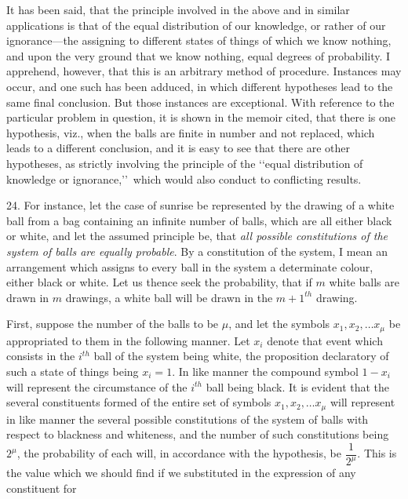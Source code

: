 \documentclass[oneside]{book}
\begin{document}
It has been said, that the principle involved in the above
and in similar applications is that of the equal distribution of
our knowledge, or rather of our ignorance---the assigning to
different states of things of which we know nothing, and upon
the very ground that we know nothing, equal degrees of probability. I apprehend, however, that this is an arbitrary method of
procedure. Instances may occur, and one such has been adduced,
in which different hypotheses lead to the same final conclusion.
But those instances are exceptional. With reference to the particular problem in question, it is shown in the memoir cited, that
there is one hypothesis, viz., when the balls are finite in number
and not replaced, which leads to a different conclusion, and it is
easy to see that there are other hypotheses, as strictly involving
the principle of the \lq\lq equal distribution of knowledge or ignorance,\rq\rq\ which would also conduct to conflicting results.

24. For instance, let the case of sunrise be represented by
the drawing of a white ball from a bag containing an infinite
number of balls, which are all either black or white, and let the
assumed principle be, that \emph{all possible constitutions of the system
of balls are equally probable}. By a constitution of the system, I
mean an arrangement which assigns to every ball in the system
a determinate colour, either black or white. Let us thence seek
the probability, that if $m$ white balls are drawn in $m$ drawings,
a white ball will be drawn in the ${m + 1}^{th}$ drawing.

First, suppose the number of the balls to be $\mu$, and let the
symbols $x_1, x_2, \dotsc x_\mu$ be appropriated to them in the following
manner. Let $x_i$ denote that event which consists in the $i^{th}$ ball
of the system being white, the proposition declaratory of such a
state of things being $x_i = 1$. In like manner the compound
symbol $1-x_i$ will represent the circumstance of the $i^{th}$ ball being
black. It is evident that the several constituents formed of the
entire set of symbols $x_1, x_2,\dotsc x_\mu$ will represent in like manner
the several possible constitutions of the system of balls with
respect to blackness and whiteness, and the number of such constitutions being $2^\mu$, the probability of each will, in accordance
with the hypothesis, be $\dfrac{1}{2^\mu}$. This is the value which we should
find if we substituted in the expression of any constituent for
\end{document}
